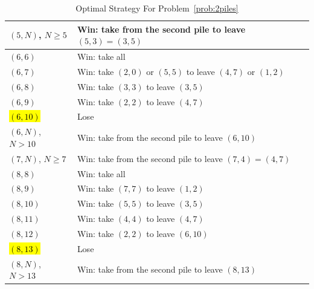 \documentclass[12pt,letterpaper]{article}
\begin{document}
\begin{enumerate}
\begin{table}[htbp]
\begin{tabular}{ll}
      $(5,N)$, $N\ge5$ & Win: take from the second pile to leave $(5,3) = (3,5)$\\\midrule
      $(6,6)$ & Win: take all \\
      $(6,7)$ & Win: take $(2,0)$ or $(5,5)$ to leave $(4,7)$ or $(1,2)$ \\
      $(6,8)$ & Win: take $(3,3)$ to leave $(3,5)$ \\
      $(6,9)$ & Win: take $(2,2)$ to leave $(4,7)$ \\
      \hl{$(6,10)$} & Lose\\
      $(6,N)$, $N>10$ & Win: take from the second pile to leave $(6,10)$\\\midrule
      $(7,N)$, $N\ge7$ & Win: take from the second pile to leave $(7,4) = (4,7)$\\\midrule
      $(8,8)$ & Win: take all \\
      $(8,9)$ & Win: take $(7,7)$ to leave $(1,2)$ \\
      $(8,10)$ & Win: take $(5,5)$ to leave $(3,5)$ \\
      $(8,11)$ & Win: take $(4,4)$ to leave $(4,7)$ \\
      $(8,12)$ & Win: take $(2,2)$ to leave $(6,10)$ \\
      \hl{$(8,13)$} & Lose\\
      $(8,N)$, $N>13$ & Win: take from the second pile to leave $(8,13)$\\\midrule
    \end{tabular}
    \caption{Optimal Strategy For Problem~\ref{prob:2piles}}
    \label{table:prob3}
  \end{table}



\end{enumerate}
\end{document}
